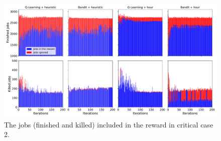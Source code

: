 \begin{figure}[!htb]
    \centering
    \includegraphics[scale=0.33]{Images/Learning_compensations/ignored_jobs_touched_scenario_2.pdf}
    \caption{The jobs (finished and killed) included in the reward in critical case 2.}
    \label{fig:reward_from_jobs_critical_2}
\end{figure}

